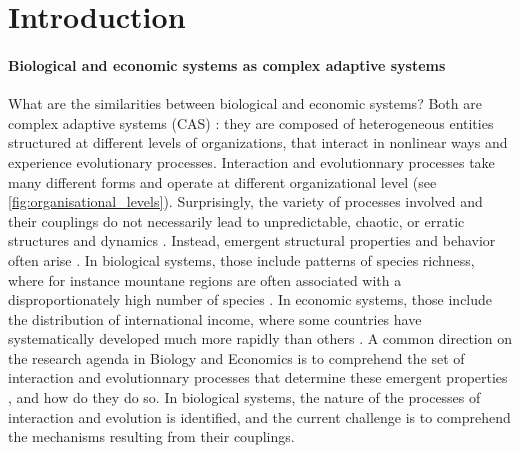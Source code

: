 %
\chapter{Introduction}



\label{sec:intro}


\subsubsection*{Biological and economic systems as complex adaptive systems}
What are the similarities between biological and economic systems? Both are complex adaptive systems (CAS) \cite{Levin2002}: they are composed of heterogeneous entities structured at different levels of organizations, that interact in nonlinear ways and experience evolutionary processes. 
% 
Interaction and evolutionnary processes take many different forms and operate at different organizational level \cite{Levin1998} (see \cref{fig:organisational_levels}).
% 
Surprisingly, the variety of processes involved and their couplings do not necessarily lead to unpredictable, chaotic, or erratic structures and dynamics \cite{Olff2009}. Instead, emergent structural properties and behavior often arise \cite{mitchell2009complexity}. 
% 
In biological systems, those include patterns of species richness, where for instance mountane regions are often associated with a disproportionately high number of species \cite{Rahbek2019}. In economic systems, those include the distribution of international income, where some countries have systematically developed much more rapidly than others \cite{acemoglu2001colonial}. 
% 
A common direction on the research agenda in Biology and Economics is to comprehend the set of interaction and evolutionnary processes that determine these emergent properties \cite{Nordbotten2018}, and how do they do so.
% 
In biological systems, the nature of the processes of interaction and evolution is identified, and the current challenge is to comprehend the mechanisms resulting from their couplings.
